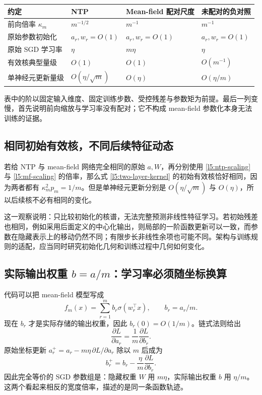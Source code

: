 \begin{center}
\begin{tabularx}{\textwidth}{@{}lXXX@{}}
\toprule
约定 & NTP & Mean-field 配对尺度 & 未配对的负对照 \\
\midrule
前向倍率 $\kappa_m$ & $m^{-1/2}$ & $m^{-1}$ & $m^{-1}$ \\
原始参数初始化 & $a_r,w_r=O(1)$ & $a_r,w_r=O(1)$ & $a_r,w_r=O(1)$ \\
原始 SGD 学习率 & $\eta$ & $m\eta$ & $\eta$ \\
有效核典型量级 & $O(1)$ & $O(1)$ & $O(m^{-1})$ \\
单神经元更新量级 & $O(\eta/\sqrt m)$ & $O(\eta)$ & $O(\eta/m)$ \\
\bottomrule
\end{tabularx}
\end{center}

表中的阶以固定输入维度、固定训练步数、受控残差与参数矩为前提。最后一列变慢，首先说明前向缩放与学习率没有配对；它不构成 mean-field 参数化本身无法训练的证据。

\subsection{相同初始有效核，不同后续特征动态}

若给 NTP 与 mean-field 网络完全相同的原始 $a,W$，再分别使用
\eqref{l5:ntp-scaling} 与 \eqref{l5:mf-scaling} 的倍率，那么式
\eqref{l5:two-layer-kernel} 的初始有效核恰好相同，因为两者都有
$\kappa_m^2p_m=1/m$。但是单神经元更新分别是 $O(\eta/\sqrt m)$ 与
$O(\eta)$，所以后续核不必有相同的变化。

这一观察说明：只比较初始化的核谱，无法完整预测非线性特征学习。若初始残差也相同，例如采用后面定义的中心化输出，则局部的一阶函数更新可以一致，而参数在隐藏表示上的移动仍然不同；有限步长非线性余项也可能不同。架构与训练规则的适配，应当同时研究初始化几何和训练过程中几何如何变化。

\subsection{实际输出权重 $b=a/m$：学习率必须随坐标换算}

代码可以把 mean-field 模型写成
\begin{equation}
 f_m(x)=\sum_{r=1}^m b_r\sigma(w_r^\top x),
 \qquad b_r=a_r/m.
 \label{l5:actual-readout}
\end{equation}
现在 $b_r$ 才是实际存储的输出权重，因此 $b_r(0)=O(1/m)$。链式法则给出
\[
 \frac{\partial L}{\partial a_r}
 =\frac1m\frac{\partial L}{\partial b_r}.
\]
原始坐标更新 $a_r^+=a_r-m\eta\,\partial L/\partial a_r$ 除以 $m$ 后成为
\begin{equation}
 \boxed{b_r^+=b_r-\frac\eta m\frac{\partial L}{\partial b_r}}.
 \label{l5:readout-lr}
\end{equation}
因此完全等价的 SGD 参数组是：隐藏权重 $W$ 用 $m\eta$，实际输出权重 $b$ 用 $\eta/m$。这两个看起来相反的宽度倍率，描述的是同一条函数轨迹。

